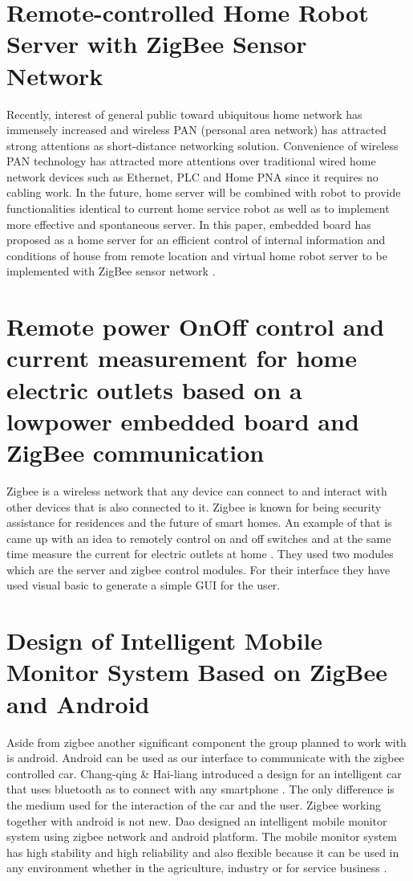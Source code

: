 \section{Remote-controlled Home Robot Server with ZigBee Sensor Network}
Recently, interest of general public toward ubiquitous home network has immensely increased and wireless PAN (personal area network) has attracted strong attentions as short-distance networking solution. Convenience of wireless PAN technology has attracted more attentions over traditional wired home network devices such as Ethernet, PLC and Home PNA since it requires no cabling work. In the future, home server will be combined with robot to provide functionalities identical to current home service robot as well as to implement more effective and spontaneous server. In this paper, embedded board has proposed as a home server for an efficient control of internal information and conditions of house from remote location and virtual home robot server to be implemented with ZigBee sensor network \cite{4108460}.

\section{Remote power On\/Off control and current measurement for home electric outlets based on a low\-power embedded board and ZigBee communication}
Zigbee is a wireless network that any device can connect to and interact with other devices that is also connected to it. Zigbee is known for being security assistance for residences and the future of smart homes. An example of that is came up with an idea to remotely control on and off switches and at the same time measure the current for electric outlets at home \cite{4559539}. They used two modules which are the server and zigbee control modules. For their interface they have used visual basic to generate a simple GUI for the user.

\section{Design of Intelligent Mobile Monitor System Based on ZigBee and Android}
Aside from zigbee another significant component the group planned to work with is android. Android can be used as our interface to communicate with the zigbee controlled car. Chang-qing \& Hai-liang introduced a design for an intelligent car that uses bluetooth as to connect with any smartphone \cite{chang2012design}. The only difference is the medium used for the interaction of the car and the user. Zigbee working together with android is not new. Dao designed an intelligent mobile monitor system using zigbee network and android platform. The mobile monitor system has high stability and high reliability and also flexible because it can be used in any environment whether in the agriculture, industry or for service business \cite{QuDao2012}.  

